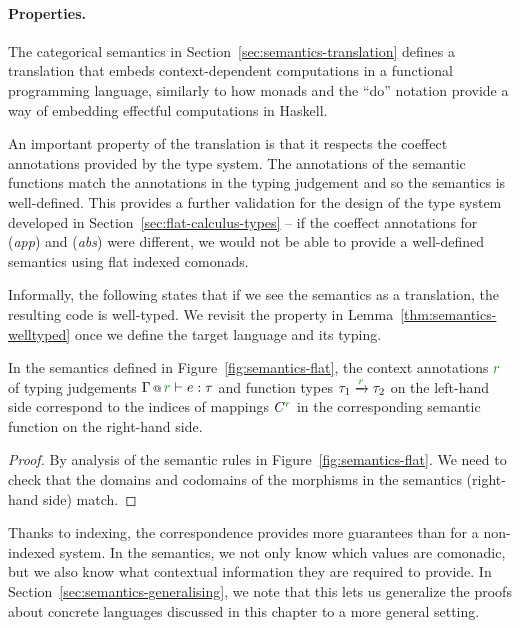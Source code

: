 \paragraph{Properties.}
The categorical semantics  in Section~\ref{sec:semantics-translation} defines a translation
that embeds context-dependent computations in a functional programming language, similarly to how
monads and the ``do'' notation provide a way of embedding effectful computations in Haskell.

An important property of the translation is that it respects the coeffect annotations provided
by the type system. The annotations of the semantic functions match the annotations in the typing
judgement and so the semantics is well-defined.
This provides a further validation for the design of the type system developed in
Section~\ref{sec:flat-calculus-types} -- if the coeffect annotations for (\emph{app}) and (\emph{abs})
were different, we would not be able to provide a well-defined semantics using flat indexed comonads.

Informally, the following states that if we see the semantics as a translation, the resulting code
is well-typed. We revisit the property in Lemma~\ref{thm:semantics-welltyped} once we define
the target language and its typing.

\begin{lemma}[Correspondence]
\label{thm:flat-correspondence}
In the semantics defined in Figure~\ref{fig:semantics-flat}, the context annotations $\cclrd{r}$ of
typing judgements $\coctx{\Gamma}{\cclrd{r}} \vdash e : \tau$ and function types
$\tau_1 \xrightarrow{\cclrd{r}} \tau_2$  on the left-hand side correspond to the indices of mappings
$\ctyp{\cclrd{r}}{}$ in the corresponding semantic function on the right-hand side.
\end{lemma}
\begin{proof}
By analysis of the semantic rules in Figure~\ref{fig:semantics-flat}. We need to check that the
domains and codomains of the morphisms in the semantics (right-hand side) match.
\end{proof}

\noindent
Thanks to indexing, the correspondence provides more guarantees than for a non-indexed system.
In the semantics, we not only know which values are comonadic, but we also know what contextual
information they are required to provide. In Section~\ref{sec:semantics-generalising}, we note
that this lets us generalize the proofs about concrete languages discussed in this chapter to
a more general setting.

